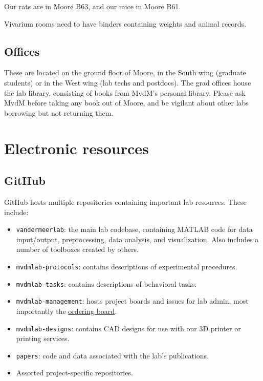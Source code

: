 \documentclass{tufte-book}
\newcommand{\doccls}[1]{\texttt{#1}}%
\begin{document}
Our rats are in Moore B63, and our mice in Moore B61.

Vivarium rooms need to have binders containing weights and animal records.

\section{Offices}

These are located on the ground floor of Moore, in the South wing
(graduate students) or in the West wing (lab techs and postdocs). The
grad offices house the lab library, consisting of books from MvdM's
personal library. Please ask MvdM before taking any book out of Moore,
and be vigilant about other labs borrowing but not returning them.

\chapter{Electronic resources}
\label{sec:elec-resources}

\section{GitHub}

GitHub hosts multiple repositories containing important lab
resources. These include:

\begin{itemize}

\item{\doccls{vandermeerlab}: the main lab codebase, containing MATLAB
  code for data input/output, preprocessing, data analysis, and
  visualization. Also includes a number of toolboxes created by others.}

\item{\doccls{mvdmlab-protocols}: contains descriptions of
  experimental procedures.}

\item{\doccls{mvdmlab-tasks}: contains descriptions of behavioral tasks.}

\item{\doccls{mvdmlab-management}}: hosts project boards and issues
  for lab admin, most importantly the
  \href{https://github.com/vandermeerlab/mvdmlab-management/projects/1}{ordering
    board}.

\item{\doccls{mvdmlab-designs}: contains CAD designs for use with our
  3D printer or printing services.}

\item{\doccls{papers}: code and data associated with the lab's publications.}

\item{Assorted project-specific repositories.}

\end{itemize}
\end{document}
